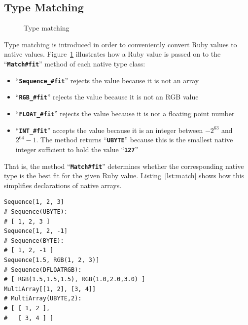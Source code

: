\documentclass[12pt,a4paper,oneside,openright]{book}
\newcommand{\Ie}{That is, }
\newcommand{\fig}[1]{Figure~\ref{fig:#1}}
\newcommand{\lst}[1]{Listing~\ref{lst:#1}}
\newcommand{\code}[1]{``\texttt{\textbf{\textcolor{codegray}{\small{#1}}}}''}
\begin{document}
\begin{CJK}{UTF8}{}
\subsection{Type Matching}
\begin{figure}[htbp]
  \begin{center}
    \caption{Type matching\label{fig:matching}}
  \end{center}
\end{figure}
Type matching is introduced in order to conveniently convert Ruby values to native values. \fig{matching} illustrates how a Ruby value is passed on to the \code{Match\#fit} method of each native type class:
\begin{itemize}
\item \code{Sequence\_\#fit} rejects the value because it is not an array
\item \code{RGB\_\#fit} rejects the value because it is not an RGB value
\item \code{FLOAT\_\#fit} rejects the value because it is not a floating point number
\item \code{INT\_\#fit} accepts the value because it is an integer between $-2^{63}$ and $2^{64}-1$. The method returns \code{UBYTE} because this is the smallest native integer sufficient to hold the value \code{127}
\end{itemize}
\Ie the method \code{Match\#fit} determines whether the corresponding native type is the best fit for the given Ruby value. \lst{match} shows how this simplifies declarations of native arrays.
\lstset{language=Ruby,frame=single,numbers=none}
\begin{lstlisting}[float=htbp,caption={Type matching},escapechar=\$,label=lst:match]
Sequence[1, 2, 3]
# Sequence(UBYTE):
# [ 1, 2, 3 ]
Sequence[1, 2, -1]
# Sequence(BYTE):
# [ 1, 2, -1 ]
Sequence[1.5, RGB(1, 2, 3)]
# Sequence(DFLOATRGB):
# [ RGB(1.5,1.5,1.5), RGB(1.0,2.0,3.0) ]
MultiArray[[1, 2], [3, 4]]
# MultiArray(UBYTE,2):
# [ [ 1, 2 ],
#   [ 3, 4 ] ]
\end{lstlisting}


\end{CJK}
\end{document}
